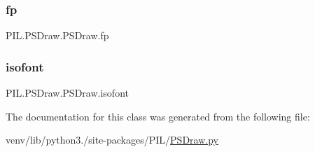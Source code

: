 \subsubsection{\texorpdfstring{fp}{fp}}
{\footnotesize\ttfamily P\+I\+L.\+P\+S\+Draw.\+P\+S\+Draw.\+fp}

\mbox{\label{classPIL_1_1PSDraw_1_1PSDraw_a9a1a5a349dc901dc348bac835cb808a0}} 
\subsubsection{\texorpdfstring{isofont}{isofont}}
{\footnotesize\ttfamily P\+I\+L.\+P\+S\+Draw.\+P\+S\+Draw.\+isofont}



The documentation for this class was generated from the following file\+:\begin{DoxyCompactItemize}
\item 
venv/lib/python3./site-\/packages/\+P\+I\+L/\hyperlink{PSDraw_8py}{P\+S\+Draw.\+py}\end{DoxyCompactItemize}
